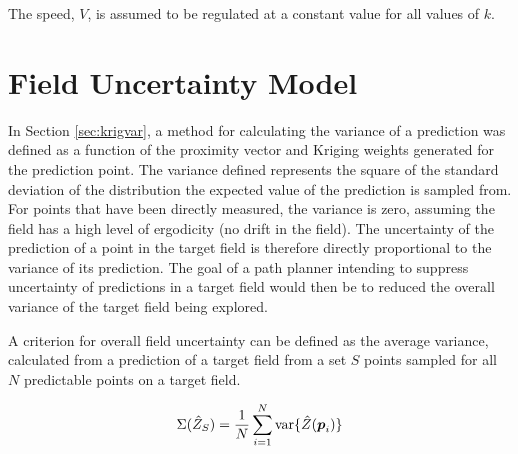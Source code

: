 The speed, $V$, is assumed to be regulated at a constant value for all values of $k$.

\section{Field Uncertainty Model} \label{sec:fielduncert}
In Section \ref{sec:krigvar}, a method for calculating the variance of a prediction was defined as a function of the proximity vector and Kriging weights generated for the prediction point. The variance defined represents the square of the standard deviation of the distribution the expected value of the prediction is sampled from. For points that have been directly measured, the variance is zero, assuming the field has a high level of ergodicity (no drift in the field). The uncertainty of the prediction of a point in the target field is therefore directly proportional to the variance of its prediction. The goal of a path planner intending to suppress uncertainty of predictions in a target field would then be to reduced the overall variance of the target field being explored.

A criterion for overall field uncertainty can be defined as the average variance, calculated from a prediction of a target field from a set $S$ points sampled for all $N$ predictable points on a target field.

\begin{equation}
	\Sigma(\hat{Z}_{S}) = \frac{1}{N}\sum_{i = 1}^N \text{var}\{\hat{Z}({\it{\boldsymbol{p}}}_i)\}
	\label{eq:fielduncert}
\end{equation}